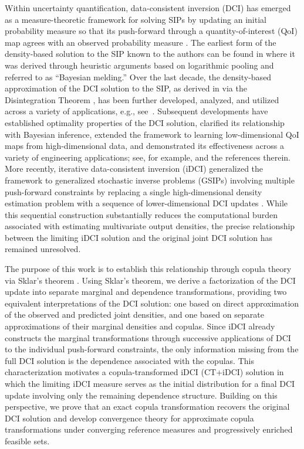 \documentclass{article}
\newcounter{example}[section]
\begin{document}
Within uncertainty quantification, data-consistent inversion (DCI) has emerged as a measure-theoretic framework for solving SIPs by updating an initial probability measure so that its push-forward through a quantity-of-interest (QoI) map agrees with an observed probability measure \cite{BJW18a}.
The earliest form of the density-based solution to the SIP known to the authors can be found in \cite{PR2000} where it was derived through heuristic arguments based on logarithmic pooling and referred to as ``Bayesian melding.''
Over the last decade, the density-based approximation of the DCI solution to the SIP, as derived in \cite{BJW18a} via the Disintegration Theorem \cite{changandpollard1997}, has been further developed, analyzed, and utilized across a variety of applications, e.g., see~\cite{ZM2023, RPK+23, tran2021solving, BGW2020, FBB25, KE25}.
Subsequent developments have established optimality properties of the DCI solution, clarified its relationship with Bayesian inference, extended the framework to learning low-dimensional QoI maps from high-dimensional data, and demonstrated its effectiveness across a variety of engineering applications; see, for example, \cite{BWY20, PCT+23, BBE24, BH20, MSB+22, RHB25} and the references therein.
More recently, iterative data-consistent inversion (iDCI) generalized the framework to generalized stochastic inverse problems (GSIPs) involving multiple push-forward constraints by replacing a single high-dimensional density estimation problem with a sequence of lower-dimensional DCI updates \cite{JBW+26}.
While this sequential construction substantially reduces the computational burden associated with estimating multivariate output densities, the precise relationship between the limiting iDCI solution and the original joint DCI solution has remained unresolved.

The purpose of this work is to establish this relationship through copula theory via Sklar's theorem \cite{Nelsen2006_copulas}.
Using Sklar's theorem, we derive a factorization of the DCI update into separate marginal and dependence transformations, providing two equivalent interpretations of the DCI solution: one based on direct approximation of the observed and predicted joint densities, and one based on separate approximations of their marginal densities and copulas.
Since iDCI already constructs the marginal transformations through successive applications of DCI to the individual push-forward constraints, the only information missing from the full DCI solution is the dependence associated with the copulas.
This characterization motivates a copula-transformed iDCI (CT+iDCI) solution in which the limiting iDCI measure serves as the initial distribution for a final DCI update involving only the remaining dependence structure.
Building on this perspective, we prove that an exact copula transformation recovers the original DCI solution and develop convergence theory for approximate copula transformations under converging reference measures and progressively enriched feasible sets.
\end{document}
